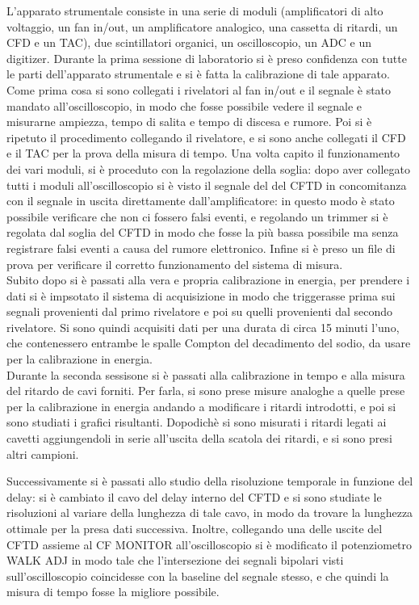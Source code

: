 L'apparato strumentale consiste in una serie di moduli (amplificatori di alto voltaggio, un fan in/out, un amplificatore analogico, una cassetta di ritardi, un CFD e un TAC),
due scintillatori organici, un oscilloscopio, un ADC e un digitizer. Durante la prima sessione di laboratorio si è preso confidenza con tutte le parti dell'apparato
strumentale e si è fatta la calibrazione di tale apparato. Come prima cosa si sono collegati i rivelatori al fan in/out e il segnale è stato mandato all'oscilloscopio,
in modo che fosse possibile vedere il segnale e misurarne ampiezza, tempo di salita e tempo di discesa e rumore. Poi si è ripetuto il procedimento collegando il rivelatore, e si
sono anche collegati il CFD e il TAC per la prova della misura di tempo. Una volta capito il funzionamento dei vari moduli, si è proceduto con la regolazione della soglia:
dopo aver collegato tutti i moduli all'oscilloscopio si è visto il segnale del del CFTD in concomitanza con il segnale in uscita direttamente dall'amplificatore: in
questo modo è stato possibile verificare che non ci fossero falsi eventi, e regolando un trimmer si è regolata dal soglia del CFTD in modo che fosse la più bassa possibile
ma senza registrare falsi eventi a causa del rumore elettronico. Infine si è preso un file di prova per verificare il corretto funzionamento del sistema di misura.\\

Subito dopo si è passati alla vera e propria calibrazione in energia, per prendere i dati si è impsotato il sistema di acquisizione in modo che triggerasse prima
sui segnali provenienti dal primo rivelatore e poi su quelli provenienti dal secondo rivelatore. Si sono quindi acquisiti dati per una durata di circa 15 minuti l'uno, che
contenessero entrambe le spalle Compton del decadimento del sodio, da usare per la calibrazione in energia.\\

Durante la seconda sessisone si è passati alla calibrazione in tempo e alla misura del ritardo de cavi forniti. Per farla, si sono prese misure analoghe a quelle prese per la calibrazione in
energia andando a modificare i ritardi introdotti, e poi si sono studiati i grafici risultanti. Dopodichè si sono misurati i ritardi legati ai cavetti aggiungendoli
in serie all'uscita della scatola dei ritardi, e si sono presi altri campioni.

Successivamente si è passati allo studio della risoluzione temporale in funzione del delay: si è cambiato il cavo del delay interno del CFTD e si sono studiate le
risoluzioni al variare della lunghezza di tale cavo, in modo da trovare la lunghezza ottimale per la presa dati successiva. Inoltre, collegando una delle uscite del
CFTD assieme al CF MONITOR all'oscilloscopio si è modificato il potenziometro WALK ADJ in modo tale che l'intersezione dei segnali bipolari visti sull'oscilloscopio
coincidesse con la baseline del segnale stesso, e che quindi la misura di tempo fosse la migliore possibile.\\


